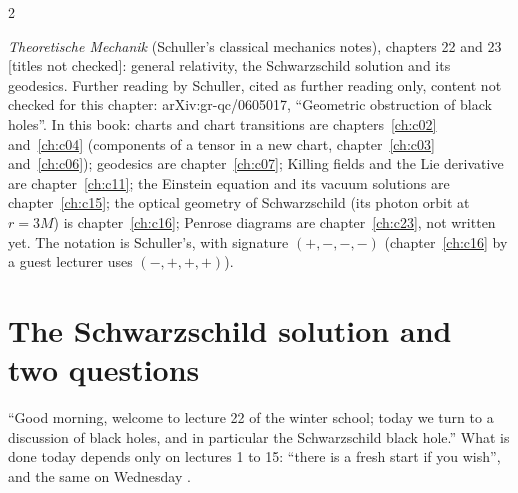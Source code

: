\begin{paracol}{2}
\begin{reading}
\emph{Theoretische Mechanik} (Schuller's classical mechanics notes), chapters 22 and 23 [titles not checked]: general relativity, the Schwarzschild solution and its geodesics. Further reading by Schuller, cited as further reading only, content not checked for this chapter: arXiv:gr-qc/0605017, ``Geometric obstruction of black holes''. In this book: charts and chart transitions are chapters~\ref{ch:c02} and~\ref{ch:c04} (components of a tensor in a new chart, chapter~\ref{ch:c03} and~\ref{ch:c06}); geodesics are chapter~\ref{ch:c07}; Killing fields and the Lie derivative are chapter~\ref{ch:c11}; the Einstein equation and its vacuum solutions are chapter~\ref{ch:c15}; the optical geometry of Schwarzschild (its photon orbit at $r=3M$) is chapter~\ref{ch:c16}; Penrose diagrams are chapter~\ref{ch:c23}, not written yet. The notation is Schuller's, with signature $(+,-,-,-)$ (chapter~\ref{ch:c16} by a guest lecturer uses $(-,+,+,+)$).
\end{reading}

\section{The Schwarzschild solution and two questions}\label{sec:c22-schw}

``Good morning, welcome to lecture 22 of the winter school; today we turn to a discussion of black holes, and in particular the Schwarzschild black hole.'' What is done today depends only on lectures 1 to 15: ``there is a fresh start if you wish'', and the same on Wednesday .


\end{paracol}
